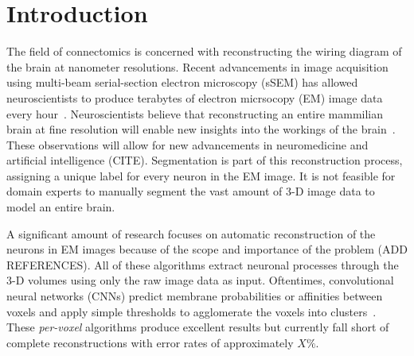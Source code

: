 \section{Introduction}

The field of connectomics is concerned with reconstructing the wiring diagram of the brain at nanometer resolutions. 
Recent advancements in image acquisition using multi-beam serial-section electron microscopy (sSEM) has allowed neuroscientists to produce terabytes of electron micrsocopy (EM) image data every hour~\cite{hildebrand2017whole}.
Neuroscientists believe that reconstructing an entire mammilian brain at fine resolution will enable new insights into the workings of the brain~\cite{kasthuri2015saturated}. 
These observations will allow for new advancements in neuromedicine and artificial intelligence (CITE). 
Segmentation is part of this reconstruction process, assigning a unique label for every neuron in the EM image. It is not feasible for domain experts to manually segment the vast amount of 3-D image data to model an entire brain.

A significant amount of research focuses on automatic reconstruction of the neurons in EM images because of the scope and importance of the problem (ADD REFERENCES).%
All of these algorithms extract neuronal processes through the 3-D volumes using only the raw image data as input.
Oftentimes, convolutional neural networks (CNNs) predict membrane probabilities or affinities between voxels and apply simple thresholds to agglomerate the voxels into clusters~\cite{lee2015recursive,ronneberger2015u}.
These \textit{per-voxel} algorithms produce excellent results but currently fall short of complete reconstructions with error rates of approximately $X\%$. %

